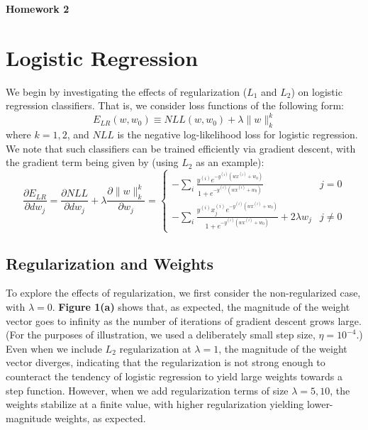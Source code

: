 \documentclass[10pt,psamsfonts]{amsart}
\theoremstyle{definition}
\theoremstyle{remark}
\numberwithin{equation}{section}
\begin{document}
	

\begin{center}
	{\bf Homework 2}
\end{center}

\section{Logistic Regression}

We begin by investigating the effects of regularization ($L_1$ and $L_2$) on logistic regression classifiers. That is, we consider loss functions of the following form:
$$E_{LR}(w, w_0) \equiv NLL(w, w_0) + \lambda\|w\|_k^k$$
where $k = 1, 2$, and $NLL$ is the negative log-likelihood loss for logistic regression. We note that such classifiers can be trained efficiently via gradient descent, with the gradient term being given by (using $L_2$ as an example):
$$\frac{\partial E_{LR}}{\partial dw_j} = \frac{\partial NLL}{\partial dw_j} + \lambda \frac{\partial \|w\|_k^k}{\partial w_j} = \left\{ \begin{matrix} -\sum_i \frac{y^{(i)} e^{-y^{(i)}(wx^{(i)} + w_0)}}{1 + e^{-y^{(i)}(wx^{(i)} + w_0)}} & j =0 \\ -\sum_i \frac{y^{(i)} x^{(i)}_j e^{-y^{(i)}(wx^{(i)} + w_0)}}{1 + e^{-y^{(i)}(wx^{(i)} + w_0)}} + 2\lambda w_j & j \neq 0 \end{matrix}  \right.$$
\subsection{Regularization and Weights} To explore the effects of regularization, we first consider the non-regularized case, with $\lambda = 0$. {\bf Figure 1(a)} shows that, as expected, the magnitude of the weight vector goes to infinity as the number of iterations of gradient descent grows large. (For the purposes of illustration, we used a deliberately small step size, $\eta = 10^{-4}$.) Even when we include $L_2$ regularization at $\lambda = 1$, the magnitude of the weight vector diverges, indicating that the regularization is not strong enough to counteract the tendency of logistic regression to yield large weights towards a step function. However, when we add regularization terms of size $\lambda = 5, 10$, the weights stabilize at a finite value, with higher regularization yielding lower-magnitude weights, as expected.
\end{document}
